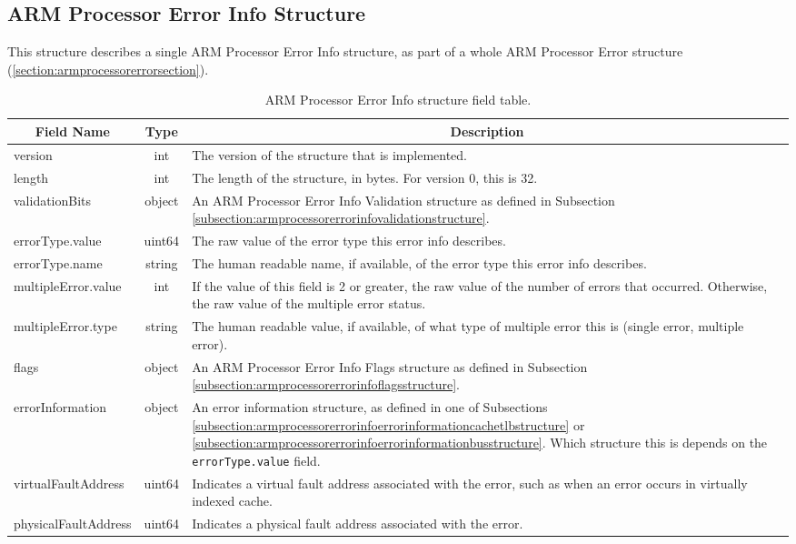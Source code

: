 \documentclass{report}
\newcommand*{\thead}[1]{\multicolumn{1}{|c|}{\bfseries #1}}
\newcommand*{\jsontable}[1]{
    \begin{table}[!ht]
    \label{#1}
    \centering
    \begin{adjustbox}{center}
    \begin{tabular}{|l|c|p{8cm}|}
    \hline
    \thead{Field Name} & \thead{Type} & \thead{Description} \\
    \hline
}
\newcommand*{\jsontableend}[1]{
    \hline
    \end{tabular}
    \end{adjustbox}
    \caption{#1}
    \label{table:#1}
    \end{table}
    \FloatBarrier
}
\begin{document}
\subsection{ARM Processor Error Info Structure}
\label{subsection:armprocessorerrorinfostructure}
This structure describes a single ARM Processor Error Info structure, as part of a whole ARM Processor Error structure (\ref{section:armprocessorerrorsection}).
\jsontable{table:armprocessorerrorinfostructure}
version & int & The version of the structure that is implemented.\\
\hline
length & int & The length of the structure, in bytes. For version 0, this is 32.\\
\hline
validationBits & object & An ARM Processor Error Info Validation structure as defined in Subsection \ref{subsection:armprocessorerrorinfovalidationstructure}.\\
\hline
errorType.value & uint64 & The raw value of the error type this error info describes.\\
errorType.name & string & The human readable name, if available, of the error type this error info describes.\\
\hline
multipleError.value & int & If the value of this field is 2 or greater, the raw value of the number of errors that occurred. Otherwise, the raw value of the multiple error status.\\
multipleError.type & string & The human readable value, if available, of what type of multiple error this is (single error, multiple error).\\
\hline
flags & object & An ARM Processor Error Info Flags structure as defined in Subsection \ref{subsection:armprocessorerrorinfoflagsstructure}.\\ 
\hline
errorInformation & object & An error information structure, as defined in one of Subsections \ref{subsection:armprocessorerrorinfoerrorinformationcachetlbstructure} or \ref{subsection:armprocessorerrorinfoerrorinformationbusstructure}. Which structure this is depends on the \texttt{errorType.value} field.\\
\hline
virtualFaultAddress & uint64 & Indicates a virtual fault address associated with the error, such as when an error occurs in virtually indexed cache.\\
\hline
physicalFaultAddress & uint64 & Indicates a physical fault address associated with the error.\\
\jsontableend{ARM Processor Error Info structure field table.}
\end{document}
